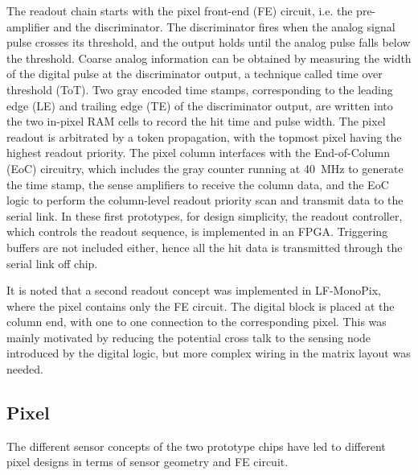 \documentclass[a4paper,11pt]{article}
\begin{document}
The readout chain starts with the pixel front-end (FE) circuit, i.e. the pre-amplifier and the discriminator. The discriminator fires when the analog signal pulse crosses its threshold, and the output holds until the analog pulse falls below the threshold. Coarse analog information can be obtained by measuring the width of the digital pulse at the discriminator output, a technique called time over threshold (ToT). Two gray encoded time stamps, corresponding to the leading edge (LE) and trailing edge (TE) of the discriminator output, are written into the two in-pixel RAM cells to record the hit time and pulse width.  The pixel readout is arbitrated by a token propagation, with the topmost pixel having the highest readout priority. The pixel column interfaces with the End-of-Column (EoC) circuitry, which includes the gray counter running at 40~MHz to generate the time stamp, the sense amplifiers to receive the column data, and the EoC logic to perform the column-level readout priority scan and transmit data to the serial link. In these first prototypes, for design simplicity, the readout controller, which controls the readout sequence, is implemented in an FPGA. Triggering buffers are not included either, hence all the hit data is transmitted through the serial link off chip.

It is noted that a second readout concept was implemented in LF-MonoPix, where the pixel contains only the FE circuit. The digital block is placed at the column end, with one to one connection to the corresponding pixel. This was mainly motivated by reducing the potential cross talk to the sensing node introduced by the digital logic, but more complex wiring in the matrix layout was needed.

\subsection{Pixel}
\label{sec:Pixel}

The different sensor concepts of the two prototype chips have led to different pixel designs in terms of sensor geometry and FE circuit.
\end{document}
